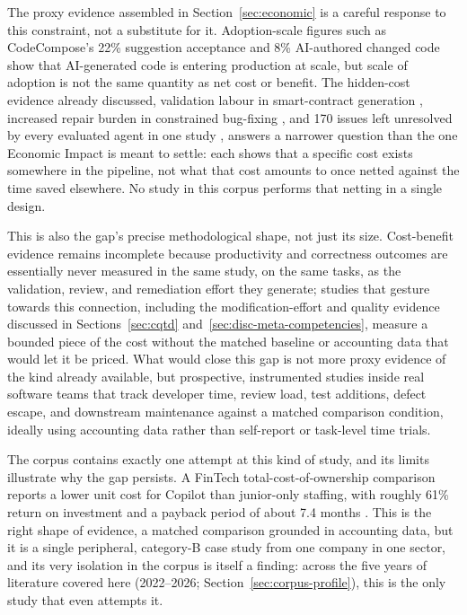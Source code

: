 The proxy evidence assembled in Section~\ref{sec:economic} is a careful response to this constraint, not a substitute for it. Adoption-scale figures such as CodeCompose's 22\% suggestion acceptance and 8\% AI-authored changed code \cite{murali_ai-assisted_2024} show that AI-generated code is entering production at scale, but scale of adoption is not the same quantity as net cost or benefit. The hidden-cost evidence already discussed, validation labour in smart-contract generation \cite{karanjai_who_2023}, increased repair burden in constrained bug-fixing \cite{jesse_large_2023}, and 170 issues left unresolved by every evaluated agent in one study \cite{chen_evaluating_2024}, answers a narrower question than the one Economic Impact is meant to settle: each shows that a specific cost exists somewhere in the pipeline, not what that cost amounts to once netted against the time saved elsewhere. No study in this corpus performs that netting in a single design.

This is also the gap's precise methodological shape, not just its size. Cost-benefit evidence remains incomplete because productivity and correctness outcomes are essentially never measured in the same study, on the same tasks, as the validation, review, and remediation effort they generate; studies that gesture towards this connection, including the modification-effort and quality evidence discussed in Sections~\ref{sec:cqtd} and~\ref{sec:disc-meta-competencies}, measure a bounded piece of the cost without the matched baseline or accounting data that would let it be priced. What would close this gap is not more proxy evidence of the kind already available, but prospective, instrumented studies inside real software teams that track developer time, review load, test additions, defect escape, and downstream maintenance against a matched comparison condition, ideally using accounting data rather than self-report or task-level time trials.

The corpus contains exactly one attempt at this kind of study, and its limits illustrate why the gap persists. A FinTech total-cost-of-ownership comparison reports a lower unit cost for Copilot than junior-only staffing, with roughly 61\% return on investment and a payback period of about 7.4 months \cite{rodriguez_comparative_2025}. This is the right shape of evidence, a matched comparison grounded in accounting data, but it is a single peripheral, category-B case study from one company in one sector, and its very isolation in the corpus is itself a finding: across the five years of literature covered here (2022--2026; Section~\ref{sec:corpus-profile}), this is the only study that even attempts it.

